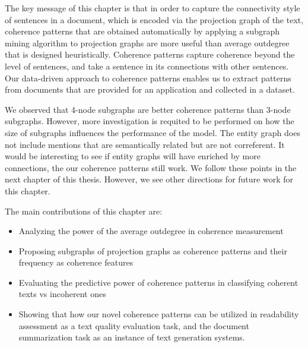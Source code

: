 The key message of this chapter is that in order to capture the connectivity style of sentences in  a document, which is encoded via the projection graph of the text, coherence patterns that are obtained automatically by applying a subgraph mining algorithm to projection graphs are more useful than average outdegree that is designed heuristically. 
Coherence patterns capture coherence beyond the level of sentences, and take a sentence in its connections with other sentences. 
Our \mbox{data-driven} approach to coherence patterns enables us to extract patterns from documents that are provided for an application and collected in a dataset. 

We observed that 4-node subgraphs are better coherence patterns than 3-node subgraphs. 
However, more investigation is requited to be performed on how the size of subgraphs influences the performance of the model. 
The entity graph does not include mentions that are semantically related but are not correferent. 
It would be interesting to see if entity graphs will have enriched by more  connections, the our coherence patterns still work. 
We follow these points in the next chapter of this thesis.  
However, we see other directions for future work for this chapter. 

The main contributions of this chapter are:

\begin{itemize}
\item Analyzing the power of the average outdegree in coherence measurement
\item Proposing subgraphs of projection graphs as coherence patterns and their frequency as coherence features 
\item Evaluating the predictive power of coherence patterns in classifying coherent texts vs incoherent ones
\item Showing that how our novel coherence patterns can be utilized in readability assessment as a text quality evaluation task, and the document summarization task as an instance of text generation systems.   
\end{itemize}


